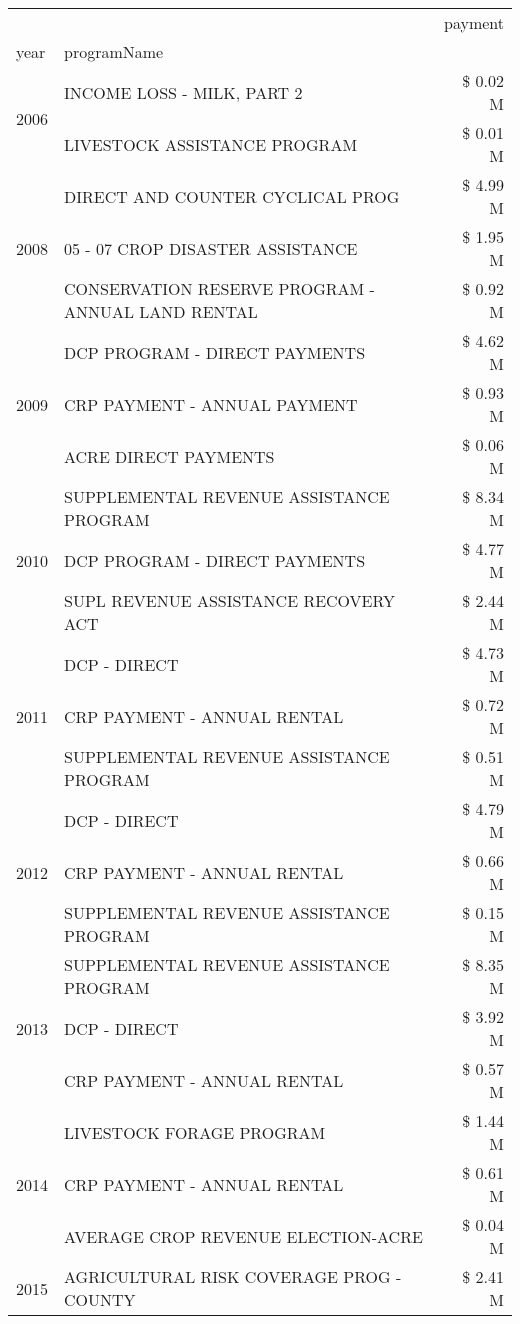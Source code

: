 \begin{tabular}{llr}
\toprule
 &  & payment \\
year & programName &  \\
\midrule
\multirow[t]{2}{*}{2006} & INCOME LOSS - MILK, PART 2 & \$ 0.02 M \\
 & LIVESTOCK ASSISTANCE PROGRAM & \$ 0.01 M \\
\cline{1-3}
\multirow[t]{3}{*}{2008} & DIRECT AND COUNTER CYCLICAL PROG & \$ 4.99 M \\
 & 05 - 07 CROP DISASTER ASSISTANCE & \$ 1.95 M \\
 & CONSERVATION RESERVE PROGRAM - ANNUAL LAND RENTAL & \$ 0.92 M \\
\cline{1-3}
\multirow[t]{3}{*}{2009} & DCP PROGRAM - DIRECT PAYMENTS & \$ 4.62 M \\
 & CRP PAYMENT - ANNUAL PAYMENT & \$ 0.93 M \\
 & ACRE DIRECT PAYMENTS & \$ 0.06 M \\
\cline{1-3}
\multirow[t]{3}{*}{2010} & SUPPLEMENTAL REVENUE ASSISTANCE PROGRAM & \$ 8.34 M \\
 & DCP PROGRAM - DIRECT PAYMENTS & \$ 4.77 M \\
 & SUPL REVENUE ASSISTANCE RECOVERY ACT & \$ 2.44 M \\
\cline{1-3}
\multirow[t]{3}{*}{2011} & DCP - DIRECT & \$ 4.73 M \\
 & CRP PAYMENT - ANNUAL RENTAL & \$ 0.72 M \\
 & SUPPLEMENTAL REVENUE ASSISTANCE PROGRAM & \$ 0.51 M \\
\cline{1-3}
\multirow[t]{3}{*}{2012} & DCP - DIRECT & \$ 4.79 M \\
 & CRP PAYMENT - ANNUAL RENTAL & \$ 0.66 M \\
 & SUPPLEMENTAL REVENUE ASSISTANCE PROGRAM & \$ 0.15 M \\
\cline{1-3}
\multirow[t]{3}{*}{2013} & SUPPLEMENTAL REVENUE ASSISTANCE PROGRAM & \$ 8.35 M \\
 & DCP - DIRECT & \$ 3.92 M \\
 & CRP PAYMENT - ANNUAL RENTAL & \$ 0.57 M \\
\cline{1-3}
\multirow[t]{3}{*}{2014} & LIVESTOCK FORAGE PROGRAM & \$ 1.44 M \\
 & CRP PAYMENT - ANNUAL RENTAL & \$ 0.61 M \\
 & AVERAGE CROP REVENUE ELECTION-ACRE & \$ 0.04 M \\
\cline{1-3}
\multirow[t]{3}{*}{2015} & AGRICULTURAL RISK COVERAGE PROG - COUNTY & \$ 2.41 M \\

\end{tabular}
